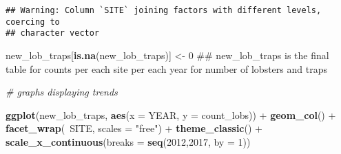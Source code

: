 \documentclass[]{article}
\newenvironment{Shaded}{\begin{snugshade}}{\end{snugshade}}
\newcommand{\KeywordTok}[1]{\textcolor[rgb]{0.13,0.29,0.53}{\textbf{{#1}}}}
\newcommand{\DataTypeTok}[1]{\textcolor[rgb]{0.13,0.29,0.53}{{#1}}}
\newcommand{\DecValTok}[1]{\textcolor[rgb]{0.00,0.00,0.81}{{#1}}}
\newcommand{\StringTok}[1]{\textcolor[rgb]{0.31,0.60,0.02}{{#1}}}
\newcommand{\CommentTok}[1]{\textcolor[rgb]{0.56,0.35,0.01}{\textit{{#1}}}}
\newcommand{\NormalTok}[1]{{#1}}
\begin{document}
\begin{Shaded}
\end{Shaded}

\begin{verbatim}
## Warning: Column `SITE` joining factors with different levels, coercing to
## character vector
\end{verbatim}

\begin{Shaded}
\begin{Highlighting}[]
\NormalTok{new_lob_traps[}\KeywordTok{is.na}\NormalTok{(new_lob_traps)] <-}\StringTok{ }\DecValTok{0}  \NormalTok{## new_lob_traps is the final table for counts per each site per each year for number of lobsters and traps}
\end{Highlighting}
\end{Shaded}

\begin{Shaded}
\begin{Highlighting}[]
\CommentTok{# graphs displaying trends}

\KeywordTok{ggplot}\NormalTok{(new_lob_traps, }\KeywordTok{aes}\NormalTok{(}\DataTypeTok{x =} \NormalTok{YEAR, }\DataTypeTok{y =} \NormalTok{count_lobs)) +}
\StringTok{  }\KeywordTok{geom_col}\NormalTok{() +}\StringTok{ }
\StringTok{  }\KeywordTok{facet_wrap}\NormalTok{(~SITE, }\DataTypeTok{scales =} \StringTok{"free"}\NormalTok{) +}
\StringTok{  }\KeywordTok{theme_classic}\NormalTok{() +}
\StringTok{  }\KeywordTok{scale_x_continuous}\NormalTok{(}\DataTypeTok{breaks =} \KeywordTok{seq}\NormalTok{(}\DecValTok{2012}\NormalTok{,}\DecValTok{2017}\NormalTok{, }\DataTypeTok{by =} \DecValTok{1}\NormalTok{))}
\end{Highlighting}
\end{Shaded}
\end{document}
